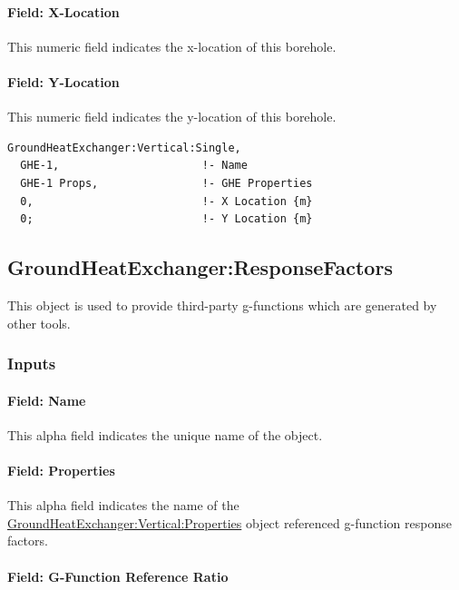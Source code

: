 \paragraph{Field: X-Location}

This numeric field indicates the x-location of this borehole.

\paragraph{Field: Y-Location}

This numeric field indicates the y-location of this borehole.

\begin{lstlisting}
GroundHeatExchanger:Vertical:Single,
  GHE-1,                      !- Name
  GHE-1 Props,                !- GHE Properties
  0,                          !- X Location {m}
  0;                          !- Y Location {m}
\end{lstlisting}

\subsection{GroundHeatExchanger:ResponseFactors}\label{groundheatexchangerresponsefactors}

This object is used to provide third-party g-functions which are generated by other tools.

\subsubsection{Inputs}

\paragraph{Field: Name}

This alpha field indicates the unique name of the object.

\paragraph{Field: Properties}

This alpha field indicates the name of the \hyperref[groundheatexchangerverticalproperties]{GroundHeatExchanger:Vertical:Properties} object referenced g-function response factors.

\paragraph{Field: G-Function Reference Ratio}\label{field-g-function-reference-ratio}

